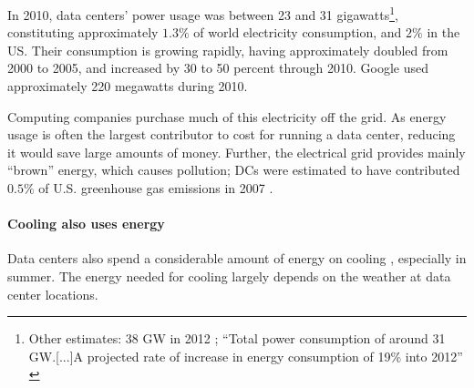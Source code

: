\documentclass{acm_proc_article-sp}
\begin{document}
			In 2010, data centers’ power usage was between 23 and 31 gigawatts\footnote{Other estimates: 38 GW in 2012 \cite{dc38GW}; “Total power consumption of around 31 GW.[...]A projected rate of increase in energy consumption of 19\% into 2012” \cite{dcd:energydemand}}, constituting approximately $1.3\%$ of world electricity consumption, and $2\%$ in the US. Their consumption is growing rapidly, having approximately doubled from 2000 to 2005, and increased by 30 to 50 percent through 2010. Google used approximately 220 megawatts during 2010. \cite{koomeyreport}
			
			Computing companies purchase much of this electricity off the grid. As energy usage is often the largest contributor to cost for running a data center, reducing it would save large amounts of money. Further, the electrical grid provides mainly “brown” energy, which causes pollution; DCs were estimated to have contributed $0.5\%$ of U.S. greenhouse gas emissions in 2007 \cite{wikipedia:dcgreenhouse}.
		
		\paragraph{Cooling also uses energy}
			Data centers also spend a considerable amount of energy on cooling \cite{datacenter}, especially in summer. The energy needed for cooling largely depends on the weather at data center locations.
			


\end{document}
